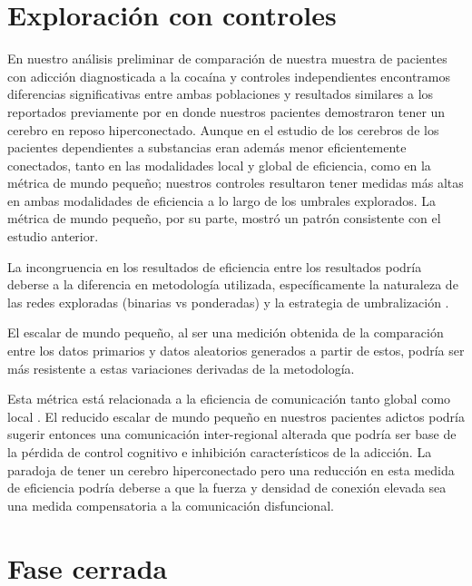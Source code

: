 \section{Exploración con controles}
En nuestro análisis preliminar de comparación de nuestra muestra de pacientes con adicción diagnosticada a la cocaína y controles independientes encontramos diferencias significativas entre ambas poblaciones y resultados similares a los reportados previamente por \textcite{Wang2015a} en donde nuestros pacientes demostraron tener un cerebro en reposo hiperconectado. Aunque en el estudio de \textcite{Wang2015a} los cerebros de los pacientes dependientes a substancias eran además menor eficientemente conectados, tanto en las modalidades local y global de eficiencia, como en la métrica de mundo pequeño; nuestros controles resultaron tener medidas más altas en ambas modalidades de eficiencia a lo largo de los umbrales explorados. La métrica de mundo pequeño, por su parte, mostró un patrón consistente con el estudio anterior. \par
La incongruencia en los resultados de eficiencia entre los resultados podría deberse a la diferencia en metodología utilizada, específicamente la naturaleza de las redes exploradas (binarias vs ponderadas) y la estrategia de umbralización \parencite{Hallquist2018}. \par
El escalar de mundo pequeño, al ser una medición obtenida de la comparación entre los datos primarios y datos aleatorios generados a partir de estos, podría ser más resistente a estas variaciones derivadas de la metodología. \par
Esta métrica está relacionada a la eficiencia de comunicación tanto global como local \parencite{Latora2001}. El reducido escalar de mundo pequeño en nuestros pacientes adictos podría sugerir entonces una comunicación inter-regional alterada que podría ser base de la pérdida de control cognitivo e inhibición característicos de la adicción. La paradoja de tener un cerebro hiperconectado pero una reducción en esta medida de eficiencia podría deberse a que la fuerza y densidad de conexión elevada sea una medida compensatoria a la comunicación disfuncional.

\section{Fase cerrada}
